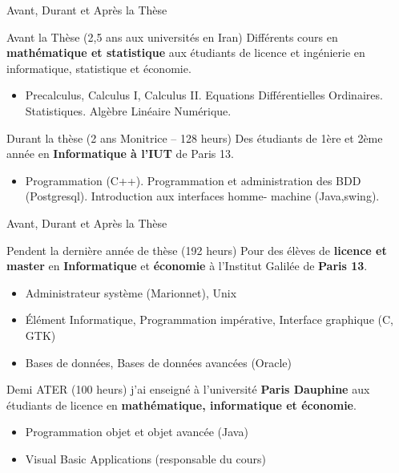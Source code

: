 \documentclass{beamer}
\begin{document}
{{{%
\begin{frame}{Avant, Durant et Après la Thèse}
\begin{block}{Avant la Thèse (2,5 ans aux universités en Iran)}
Différents cours en \textbf{mathématique et statistique} aux étudiants de licence et ingénierie en informatique, statistique et économie.
\begin{itemize}
\item Precalculus, Calculus I, Calculus II. Equations Différentielles Ordinaires. Statistiques. Algèbre Linéaire Numérique.
\end{itemize}
\end{block}

\begin{block}{Durant la thèse (2 ans Monitrice -- 128 heurs)}
Des étudiants de 1ère et 2ème année en \textbf{Informatique à l'IUT} de Paris 13.

\begin{itemize}
\item Programmation (C++). Programmation et administration des BDD (Postgresql). Introduction aux interfaces homme- machine (Java,swing).
\end{itemize}
\end{block}

\end{frame}

\begin{frame}{Avant, Durant et Après la Thèse}

\begin{block}{Pendent la dernière année de thèse (192 heurs)}
Pour des élèves de \textbf{licence et master} en \textbf{Informatique} et \textbf{économie} à l'Institut Galilée de \textbf{Paris 13}.
\begin{itemize}
 \item Administrateur système (Marionnet), Unix
 \item Élément Informatique, Programmation impérative, Interface graphique (C, GTK)
 \item Bases de données, Bases de données avancées (Oracle)
\end{itemize}
\end{block}
\begin{block}{Demi ATER (100 heurs)}
j'ai enseigné à l'université \textbf{Paris Dauphine} aux étudiants de licence en \textbf{mathématique, informatique et économie}.
\begin{itemize} 
\item Programmation objet et objet avancée (Java)
\item Visual Basic Applications (responsable du cours)
\end{itemize}


\end{block}
\end{frame}}}}
\end{document}
